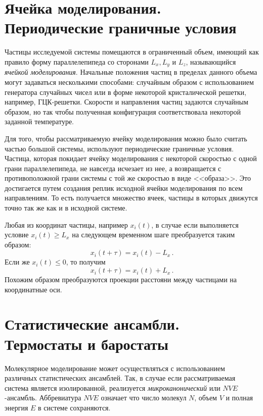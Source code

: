 \section{Ячейка моделирования. Периодические граничные условия}

Частицы исследуемой системы помещаются в ограниченный объем, имеющий как правило форму параллелепипеда со сторонами $L_x, L_y$ и $L_z$, называющийся \textit{ячейкой моделирования}. Начальные положения частиц в пределах данного объема могут задаваться несколькими способами: случайным образом с использованием генератора случайных чисел или в форме некоторой кристалической решетки, например, ГЦК-решетки. Скорости и направления частиц задаются случайным образом, но так чтобы полученная конфигурация соответствовала некоторой заданной температуре.

\par Для того, чтобы рассматриваемую ячейку моделирования можно было считать частью большой системы, используют периодические граничные условия. Частица, которая покидает ячейку моделирования с некоторой скоростью с одной грани параллелепипеда, не навсегда исчезает из нее, а возвращается с противоположной грани системы с той же скоростью в виде <<образа>>. Это достигается путем создания реплик исходной ячейки моделирования по всем направлениям. То есть получается множество ячеек, частицы в которых движутся точно так же как и в исходной системе.

Любая из координат частицы, например $x_i(t)$, в случае если выполняется условие $x_i(t)\geq L_x$ на следующем временном шаге преобразуется таким образом:
\begin{equation}
    x_i(t+\tau) = x_i(t)-L_x\,.
    \label{eq2.3.1}
\end{equation} 
Если же $x_i(t)\leq 0$, то получим
\begin{equation}
    x_i(t+\tau) = x_i(t)+L_x\,.
\end{equation}
Похожим образом преобразуются проекции расстояни между частицами на координатные оси.

\section{Статистические ансамбли. Термостаты и баростаты}
Молекулярное моделирование может осуществляться с использованием различных статистических ансамблей. Так, в случае если рассматриваемая система является изолированной, реализуется \textit{микроканонический} или $NVE$-ансамбль. Аббревиатура $NVE$ означает что число молекул $N$, объем $V$ и полная энергия $E$ в системе сохраняются.

